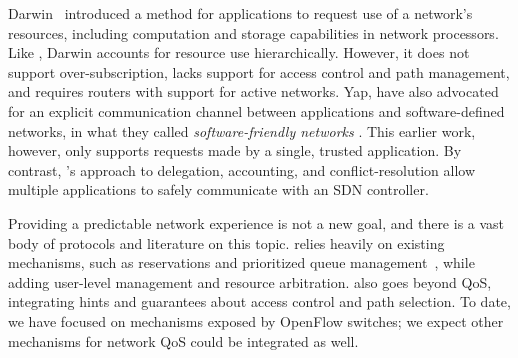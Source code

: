 %
Darwin~\cite{Darwin} introduced a method for
applications to request use of a network's resources, including
computation and storage capabilities in network processors. Like
\sys, Darwin accounts for resource use hierarchically. However, it
does not support over-subscription, lacks support for
access control and path management, and requires routers with
support for active networks.
%
Yap, \etal have also advocated for an explicit communication channel
between applications and software-defined networks,
in what they called \emph{software-friendly networks} \cite{Yap:2009}.
This earlier work, however, only supports requests made by a single,
trusted application. By contrast, \sys's approach to delegation,
accounting, and conflict-resolution allow multiple applications to
safely communicate with an SDN controller.






Providing a predictable network experience is not a new goal, and there is a
vast body of protocols and literature on this topic.  \sys relies
heavily on existing mechanisms, such as reservations and prioritized
queue management~\cite{Kim:2010,Stoica:1997}, while adding
user-level management and resource arbitration.
\sys also goes beyond QoS, integrating  hints
and guarantees about access control and path selection.
To date, we have focused on mechanisms exposed by OpenFlow
switches; we expect other mechanisms for network QoS %
could be integrated as well.

